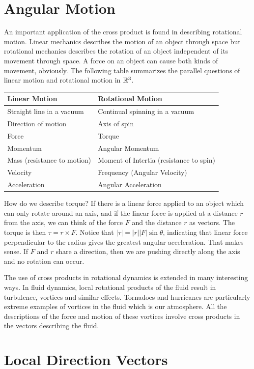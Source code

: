 \documentclass[fleqn]{report}
\begin{document}
\section{Angular Motion}

An important application of the cross product is found in describing
rotational motion. Linear mechanics describes the motion of
an object through space but rotational mechanics describes the
rotation of an object independent of its movement through
space. A force on an object can cause both kinds of movement,
obviously. The following table summarizes the parallel questions of
linear motion and rotational motion in $\mathbb{R}^3$.

\begin{tabular}{l|l}
Linear Motion & Rotational Motion \\
\hline
Straight line in a vacuum & Continual spinning in a vacuum \\
Direction of motion & Axis of spin \\
Force & Torque \\
Momentum & Angular Momentum \\
Mass (resistance to motion) & Moment of Intertia (resistance
to spin) \\
Velocity & Frequency (Angular Velocity) \\
Acceleration & Angular Acceleration
\end{tabular}

How do we describe torque? If there is a linear force applied
to an object which can only rotate around an axis, and if
the linear force is applied at a distance $r$ from the axis,
we can think of the force $F$ and the distance $r$ as vectors.
The torque is then $\tau = r \times F$. Notice that $|\tau|
= |r||F| \sin \theta$, indicating that linear force
perpendicular to the radius gives the greatest angular
acceleration. That makes sense. If $F$ and $r$ share a
direction, then we are pushing directly along the axis and no
rotation can occur. 

The use of cross products in rotational dynamics is extended
in many interesting ways. In fluid dynamics, local rotational
products of the fluid result in turbulence, vortices
 and similar effects. Tornadoes and
hurricanes are particularly extreme examples of vortices
in the fluid which is our atmosphere. All the
descriptions of the force and motion of these vortices involve
cross products in the vectors describing the fluid. 

\section{Local Direction Vectors}
\end{document}
